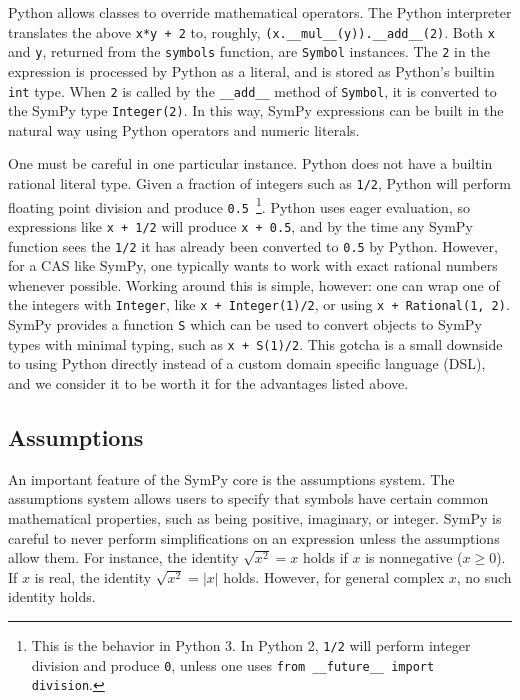Python allows classes to override mathematical operators. The Python interpreter
translates the above \texttt{x*y + 2} to, roughly,
\verb|(x.__mul__(y)).__add__(2)|. Both \texttt{x} and \texttt{y}, returned from
the \texttt{symbols} function, are \texttt{Symbol} instances. The \texttt{2}
in the expression is processed by Python as a literal, and is stored as
Python's builtin \texttt{int} type. When \texttt{2} is called by the
\verb|__add__| method of \texttt{Symbol}, it is converted to the SymPy type
\verb|Integer(2)|. In this way, SymPy expressions can be built in the natural
way using Python operators and numeric literals.

One must be careful in one particular instance. Python does not have a builtin
rational literal type. Given a fraction of integers such as \texttt{1/2},
Python will perform floating point division and produce
\texttt{0.5}~\footnote{This is the behavior in Python 3. In Python 2,
\texttt{1/2} will perform integer division and produce \texttt{0}, unless one
uses \texttt{from \_\_future\_\_ import division}.}. Python uses eager
evaluation, so expressions like \texttt{x + 1/2} will produce \texttt{x + 0.5},
and by the time any SymPy function sees the \texttt{1/2} it has already been
converted to \texttt{0.5} by Python. However, for a CAS like SymPy, one
typically wants to work with exact rational numbers whenever possible. Working
around this is simple, however: one can wrap one of the integers with
\texttt{Integer}, like \verb|x + Integer(1)/2|, or using
\verb|x + Rational(1, 2)|. SymPy provides a function \texttt{S} which can be
used to convert objects to SymPy types with minimal typing, such as
\verb|x + S(1)/2|.  This gotcha is a small downside to using Python directly
instead of a custom domain specific language (DSL), and we consider it to be
worth it for the advantages listed above.

\subsection{Assumptions}

An important feature of the SymPy core is the assumptions system. The
assumptions system allows users to specify that symbols have certain common
mathematical properties, such as being positive, imaginary, or integer. SymPy
is careful to never perform simplifications on an expression unless the
assumptions allow them. For instance, the identity $\sqrt{x^2} = x$ holds if
$x$ is nonnegative ($x\ge 0$). If $x$ is real, the identity $\sqrt{x^2}=|x|$
holds. However, for general complex $x$, no such identity holds.

